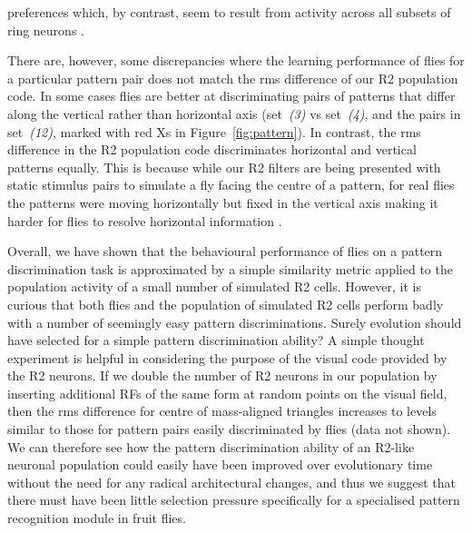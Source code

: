 preferences which, by contrast, seem to result from activity across all subsets of ring neurons \cite{Solanki2015}.

There are, however, some discrepancies where the learning performance of flies for a particular pattern pair does not match the \ac{rms} difference of our R2 population code. In some cases flies are better at discriminating pairs of patterns that differ along the vertical rather than horizontal axis (set~\emph{(3)} vs set~\emph{(4)}, and the pairs in set~\emph{(12)}, marked with red Xs in Figure~\ref{fig:pattern}). In contrast, the \ac{rms} difference in the R2 population code discriminates horizontal and vertical patterns equally. This is because while our R2 filters are being presented with static stimulus pairs to simulate a fly facing the centre of a pattern, for real flies the patterns were moving horizontally but fixed in the vertical axis making it harder for flies to resolve horizontal information \cite{Ernst1999}.

Overall, we have shown that the behavioural performance of flies on a pattern discrimination task is approximated by a simple similarity metric applied to the population activity of a small number of simulated R2 cells. However, it is curious that both flies and the population of simulated R2 cells perform badly with a number of seemingly easy pattern discriminations. Surely evolution should have selected for a simple pattern discrimination ability? A simple thought experiment is helpful in considering the purpose of the visual code provided by the R2 neurons. If we double the number of R2 neurons in our population by inserting additional \acp{RF} of the same form at random points on the visual field, then the \ac{rms} difference for centre of mass-aligned triangles increases to levels similar to those for pattern pairs easily discriminated by flies (data not shown). We can therefore see how the pattern discrimination ability of an R2-like neuronal population could easily have been improved over evolutionary time without the need for any radical architectural changes, and thus we suggest that there must have been little selection pressure specifically for a specialised pattern recognition module in fruit flies.

\begin{comment}
Sig:
above: 8; below: 0; eq: 0; not given: 0; tot: 8
------
NS:
above: 5; below: 13; eq: 0; not given: 1; tot: 19
------
Sig not given:
above: 3; eq: 3; below: 0; not given: 3; tot: 9
------
tot tot: 36
\end{comment}


